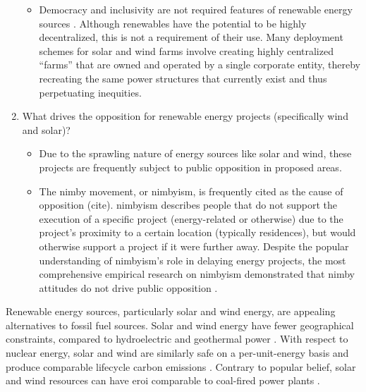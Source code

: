 \begin{enumerate}
\begin{itemize}
        \item Democracy and inclusivity are not required features of renewable
        energy sources \cite{bell_toward_2020,winner_artifacts_1980}. Although
        renewables have the potential to be highly decentralized, this is not a
        requirement of their use. Many deployment schemes for solar and wind
        farms involve creating highly centralized ``farms'' that are owned and
        operated by a single corporate entity, thereby recreating the same power
        structures that currently exist and thus perpetuating inequities.
    \end{itemize}
    \item What drives the opposition for renewable energy projects (specifically
    wind and solar)?
    \begin{itemize}
        \item Due to the sprawling nature of energy sources like solar and wind,
        these projects are frequently subject to public opposition in proposed
        areas.
        \item The \ac{nimby} movement, or \acs{nimbyism}, is frequently cited as
        the cause of opposition (cite). \ac{nimbyism} describes people that do
        not support the execution of a specific project (energy-related or
        otherwise) due to the project's proximity to a certain location
        (typically residences), but would otherwise support a project if it were
        further away. Despite the popular understanding of \ac{nimbyism}'s role
        in delaying energy projects, the most comprehensive empirical research
        on \ac{nimbyism} demonstrated that \ac{nimby} attitudes do not drive
        public opposition \cite{konisky_proximity_2021}. 
    \end{itemize}
\end{enumerate}


Renewable energy sources, particularly solar and wind energy, are appealing
alternatives to fossil fuel sources. Solar and wind energy have fewer
geographical constraints, compared to hydroelectric and geothermal power
\cite{lopez_us_2012}. With respect to nuclear energy, solar and wind are
similarly safe on a per-unit-energy basis and produce comparable lifecycle
carbon emissions
\cite{united_nations_economic_commission_for_europe_carbon_2022,sovacool_balancing_2016,
intergovernmental_panel_on_climate_change_climate_2014}. Contrary to popular
belief, solar and wind resources can have \ac{eroi} comparable to coal-fired
power plants \cite{murphy_energy_2022}.
